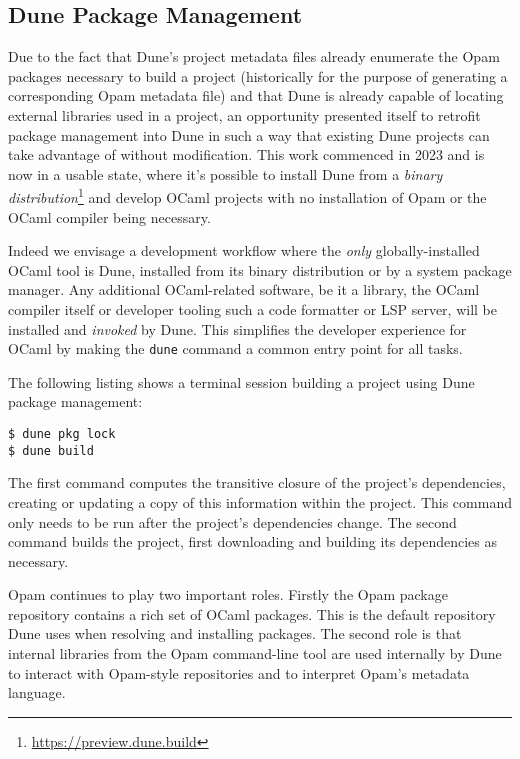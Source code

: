 \documentclass{article}
\begin{document}
\begin{multicols}{2}
        \section {Dune Package Management}

        Due to the fact that Dune's project metadata files already enumerate
        the Opam packages necessary to build a project (historically for the
        purpose of generating a corresponding Opam metadata file) and that Dune
        is already capable of locating external libraries used in a project, an
        opportunity presented itself to retrofit package management into Dune in
        such a way that existing Dune projects can take advantage of without
        modification. This work commenced in 2023 and is now in a usable state,
        where it's possible to install Dune from a \textit{binary
        distribution}\footnote{\url{https://preview.dune.build}} and develop OCaml
        projects with no installation of Opam or the OCaml compiler being
        necessary.

        Indeed we envisage a development workflow where the \textit{only}
        globally-installed OCaml tool is Dune, installed from its binary
        distribution or by a system package manager. Any additional
        OCaml-related software, be it a library, the OCaml compiler itself or
        developer tooling such a code formatter or LSP server, will be installed
        and \textit{invoked} by Dune. This simplifies the developer experience
        for OCaml by making the \texttt{dune} command a common entry point for all
        tasks.

        The following listing shows a terminal session building a project using
        Dune package management:
        \begin{lstlisting}
$ dune pkg lock
$ dune build
        \end{lstlisting}

        The first command computes the transitive closure of the project's
        dependencies, creating or updating a copy of this information within the
        project. This command only needs to be run after the project's
        dependencies change. The second command builds the project, first
        downloading and building its dependencies as necessary.

        Opam continues to play two important roles. Firstly the Opam package
        repository contains a rich set of OCaml packages. This is the default
        repository Dune uses when resolving and installing packages. The second
        role is that internal libraries from the Opam command-line tool are
        used internally by Dune to interact with Opam-style repositories and to
        interpret Opam's metadata language.


\end{multicols}
\end{document}
